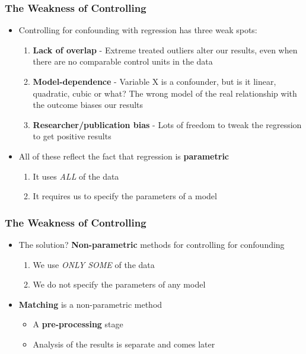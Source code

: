 \documentclass[xcolor=x11names,compress]{beamer}\usepackage[]{graphicx}\usepackage[]{color}
\renewcommand{\(}{\begin{columns}}
\renewcommand{\)}{\end{columns}}
\newcommand{\<}[1]{\begin{column}{#1}}
\renewcommand{\>}{\end{column}}
\begin{document}
\begin{frame}
\frametitle{The Weakness of Controlling}
\begin{itemize}
\item Controlling for confounding with regression has three weak spots:
\pause
\begin{enumerate}
\item \textbf{Lack of overlap} - Extreme treated outliers alter our results, even when there are no comparable control units in the data
\pause
\item \textbf{Model-dependence} - Variable X is a confounder, but is it linear, quadratic, cubic or what? The wrong model of the real relationship with the outcome biases our results
\pause
\item \textbf{Researcher/publication bias} - Lots of freedom to tweak the regression to get positive results
\pause
\end{enumerate}
\item All of these reflect the fact that regression is \textbf{parametric}
\pause
\begin{enumerate}
\item It uses \textit{ALL} of the data
\item It requires us to specify the parameters of a model
\end{enumerate}
\end{itemize}
\end{frame}

\begin{frame}
\frametitle{The Weakness of Controlling}
\begin{itemize}
\item The solution? \pause \textbf{Non-parametric} methods for controlling for confounding
\pause
\begin{enumerate}
\item We use \textit{ONLY SOME} of the data
\item We do not specify the parameters of any model
\end{enumerate}
\pause
\item \textbf{Matching} is a non-parametric method
\pause
\begin{itemize}
\item A \textbf{pre-processing} stage 
\item Analysis of the results is separate and comes later
\end{itemize}
\end{itemize}
\end{frame}
\end{document}

